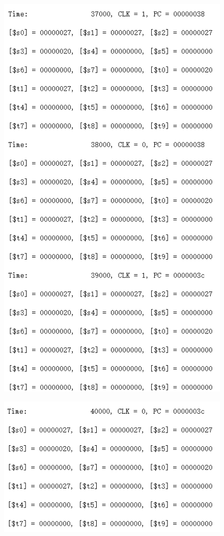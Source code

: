 \documentclass[12pt]{article}
\begin{document}
\begin{figure}[H]
\centering
\includegraphics[scale=1]{R13.jpg}
\end{figure}
\begin{figure}[H]
\centering
\includegraphics[scale=1]{R14.jpg}
\end{figure}
\end{document}
